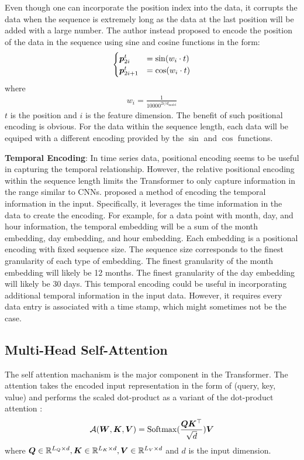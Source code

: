 \documentclass{article} %
\begin{document}
Even though one can incorporate the position index into the data, it corrupts the data when the sequence is extremely long as the data at the last position will be added with a large number.
The author instead proposed to encode the position of the data in the sequence using sine and cosine functions in the form:
\begin{align}
  \begin{cases}
          {\bm{p}}_{2i}^{t}   &= \sin ( w_{i} \cdot t ) \\
          {\bm{p}}_{2i+1}^{t} &= \cos ( w_{i} \cdot t )
  \end{cases}
\end{align}
where
\begin{align}
        w_{i} = \frac{1}{10000^{2i/d_{\mathrm{model}}}}
\end{align}
$t$ is the position and $i$ is the feature dimension.
The benefit of such positional encoding is obvious.
For the data within the sequence length, each data will be equiped with a different encoding provided by the $\sin$ and $\cos$ functions.

\textbf{Temporal Encoding}: In time series data, positional encoding seems to be useful in capturing the temporal relationship.
However, the relative positional encoding within the sequence length limits the Transformer to only capture information in the range similar to CNNs.
\citet{haoyietal-informer-2021} proposed a method of encoding the temporal information in the input.
Specifically, it leverages the time information in the data to create the encoding.
For example, for a data point with month, day, and hour information, the temporal embedding will be a sum of the month embedding, day embedding, and hour embedding.
Each embedding is a positional encoding with fixed sequence size.
The sequence size corresponds to the finest granularity of each type of embedding.
The finest granularity of the month embedding will likely be 12 months.
The finest granularity of the day embedding will likely be 30 days.
This temporal encoding could be useful in incorporating additional temporal information in the input data.
However, it requires every data entry is associated with a time stamp, which might sometimes not be the case.


\subsection{Multi-Head Self-Attention}

The self attention machanism is the major component in the Transformer.
The attention takes the encoded input representation in the form of (query, key, value) and performs the scaled dot-product as a variant of the dot-product attention \citet{luong-etal-2015-effective}:
\begin{equation}
        {\mathcal{A}} ( {\bm{W}}, {\bm{K}}, {\bm{V}} ) = \mathrm{Softmax} ( \frac{{\bm{Q}} {\bm{K}}^{\top}}{\sqrt{d}} ) {\bm{V}}
\end{equation}
where ${\bm{Q}} \in \mathbb{R}^{L_{Q} \times d}, {\bm{K}} \in \mathbb{R}^{L_{K} \times d}, {\bm{V}} \in \mathbb{R}^{L_{V} \times d}$ and $d$ is the input dimension.
\end{document}
